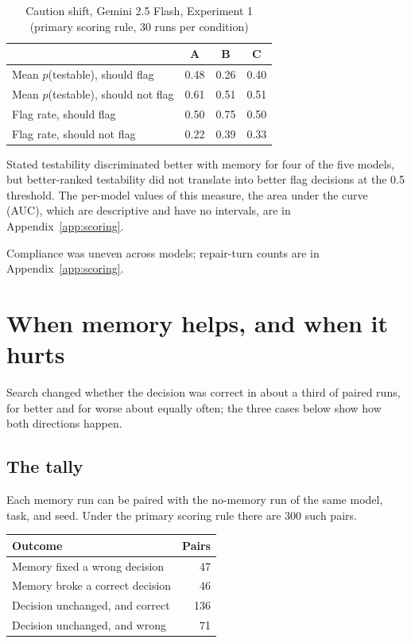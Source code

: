 \documentclass[11pt]{article}
\begin{document}
\begin{table}[ht]
\centering
\caption{Caution shift, Gemini 2.5 Flash, Experiment 1 (primary scoring rule, 30 runs per condition)}
\label{tab:caution}
\begin{tabular}{lccc}
\toprule
 & A & B & C \\
\midrule
Mean $p$(testable), should flag & 0.48 & 0.26 & 0.40 \\
Mean $p$(testable), should not flag & 0.61 & 0.51 & 0.51 \\
Flag rate, should flag & 0.50 & 0.75 & 0.50 \\
Flag rate, should not flag & 0.22 & 0.39 & 0.33 \\
\bottomrule
\end{tabular}
\end{table}

Stated testability discriminated better with memory for four of the five models, but better-ranked testability did not translate into better flag decisions at the 0.5 threshold. The per-model values of this measure, the area under the curve (AUC), which are descriptive and have no intervals, are in Appendix~\ref{app:scoring}.

Compliance was uneven across models; repair-turn counts are in Appendix~\ref{app:scoring}.

\section{When memory helps, and when it hurts}
\label{sec:transfer}

Search changed whether the decision was correct in about a third of paired runs, for better and for worse about equally often; the three cases below show how both directions happen.

\subsection{The tally}

Each memory run can be paired with the no-memory run of the same model, task, and seed. Under the primary scoring rule there are 300 such pairs.

\begin{center}
\begin{tabular}{lr}
\toprule
Outcome & Pairs \\
\midrule
Memory fixed a wrong decision & 47 \\
Memory broke a correct decision & 46 \\
Decision unchanged, and correct & 136 \\
Decision unchanged, and wrong & 71 \\
\bottomrule
\end{tabular}
\end{center}
\end{document}
